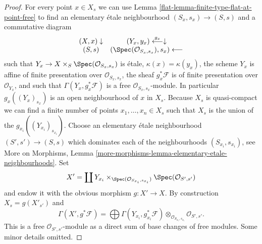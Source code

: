 \begin{proof}

For every point $x \in X_s$ we can use
Lemma \ref{flat-lemma-finite-type-flat-at-point-free}
to find an elementary \'etale neighbourhood $(S_x , s_x) \to (S, s)$
and a commutative diagram
$$
\begin{array}{cc}(X, x) \downarrow & (Y_x, y_x) \overset{g_x}{\longleftarrow}\downarrow \\ (S, s) & (\Spec(\mathcal{O}_{S_x, s_x}), s_x) \longleftarrow\end{array}
$$
such that $Y_x \to X \times_S \Spec(\mathcal{O}_{S_x, s_x})$
is \'etale, $\kappa(x) = \kappa(y_x)$, the scheme $Y_x$ is affine
of finite presentation over $\mathcal{O}_{S_x, s_x}$, the sheaf
$g_x^*\mathcal{F}$ is of finite presentation over $\mathcal{O}_{Y_x}$, and
such that $\Gamma(Y_x, g_x^*\mathcal{F})$ is a free
$\mathcal{O}_{S_x, s_x}$-module. In particular
$g_x((Y_x)_{s_x})$ is an open neighbourhood of $x$ in $X_s$.
Because $X_s$ is quasi-compact we can find a finite number of points
$x_1, \ldots, x_n \in X_s$ such that $X_s$ is the union of
the $g_{x_i}((Y_{x_i})_{s_{x_i}})$. Choose an elementary \'etale neighbourhood
$(S' , s') \to (S, s)$ which dominates each of the neighbourhoods
$(S_{x_i}, s_{x_i})$, see
More on Morphisms,
Lemma \ref{more-morphisms-lemma-elementary-etale-neighbourhoods}.
Set
$$
X' = \coprod Y_{x_i} \times_{\Spec(\mathcal{O}_{S_{x_i}, s_{x_i}})}
\Spec(\mathcal{O}_{S', s'})
$$
and endow it with the obvious morphism $g : X' \to X$.
By construction $X_s = g(X'_{s'})$ and
$$
\Gamma(X', g^*\mathcal{F})
=
\bigoplus \Gamma(Y_{x_i}, g_{x_i}^*\mathcal{F})
\otimes_{\mathcal{O}_{S_{x_i}, s_{x_i}}}
\mathcal{O}_{S', s'}.
$$
This is a free $\mathcal{O}_{S', s'}$-module as a direct sum
of base changes of free modules. Some minor details omitted.
\end{proof}

